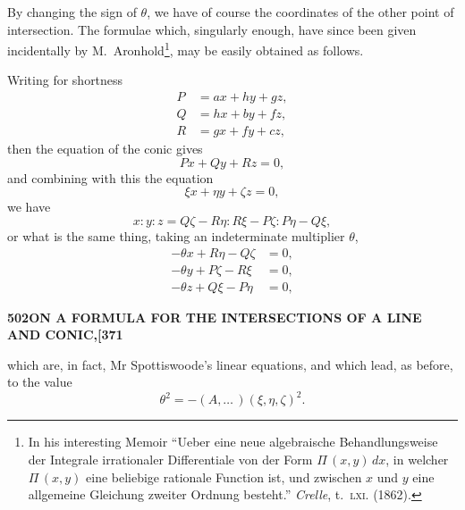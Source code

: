 \documentclass[11pt,a4paper]{article}
\begin{document}
By changing the sign of $\theta$, we have of course the coordinates of the other point of intersection. The formulae which, singularly enough, have since been given incidentally by M.~Aronhold\footnote{In his interesting Memoir ``Ueber eine neue algebraische Behandlungsweise der Integrale irrationaler Differentiale von der Form $\Pi\,(x, y)\,dx$, in welcher $\Pi\,(x, y)$ eine beliebige rationale Function ist, und zwischen $x$ und $y$ eine allgemeine Gleichung zweiter Ordnung besteht.'' \textit{Crelle}, t.~\textsc{lxi}. (1862).}, may be easily obtained as follows.

Writing for shortness
\begin{align*}
P &= ax + hy + gz,\\
Q &= hx + by + fz,\\
R &= gx + fy + cz,
\end{align*}
then the equation of the conic gives
\[
Px + Qy + Rz = 0,
\]
and combining with this the equation
\[
\xi x + \eta y + \zeta z = 0,
\]
we have
\[
x : y : z = Q\zeta - R\eta : R\xi - P\zeta : P\eta - Q\xi,
\]
or what is the same thing, taking an indeterminate multiplier $\theta$,
\begin{align*}
-\theta x + R\eta - Q\zeta &= 0,\\
-\theta y + P\zeta - R\xi &= 0,\\
-\theta z + Q\xi - P\eta &= 0,
\end{align*}

\newpage
\noindent\textbf{502\hspace{1em}ON A FORMULA FOR THE INTERSECTIONS OF A LINE AND CONIC,\hfill[371}

\vspace{12pt}

\noindent
which are, in fact, Mr Spottiswoode's linear equations, and which lead, as before, to the value
\[
\theta^{2} = -(A, \ldots \,)(\xi, \eta, \zeta)^{2}.
\]
\end{document}
